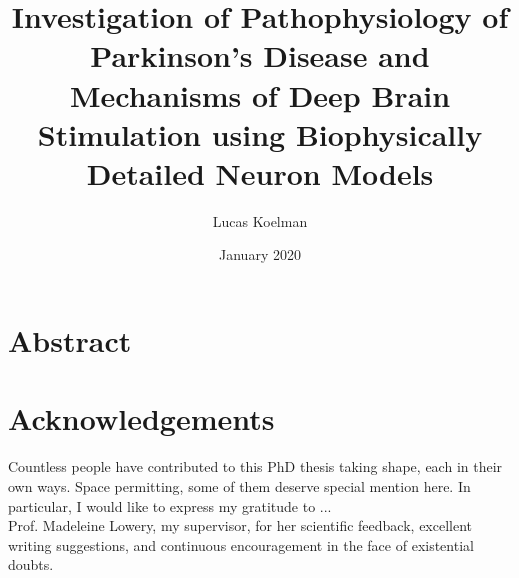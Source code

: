 \documentclass[11pt]{book} %
\title{Investigation of Pathophysiology of Parkinson's Disease and Mechanisms of Deep Brain Stimulation using Biophysically Detailed Neuron Models}
\author{Lucas Koelman}
\date{January 2020} %
\begin{document}
% 



\tableofcontents



\frontmatter %

\chapter*{Abstract}
\label{fm:abstract}




\chapter*{Acknowledgements}

Countless people have contributed to this PhD thesis taking shape, each
in their own ways. Space permitting, some of them deserve special mention here.
In particular, I would like to express my gratitude to ...\\

\noindent
Prof. Madeleine Lowery, my supervisor, for her scientific feedback, excellent
writing suggestions, and continuous encouragement in the face of existential doubts.\\
\end{document}
